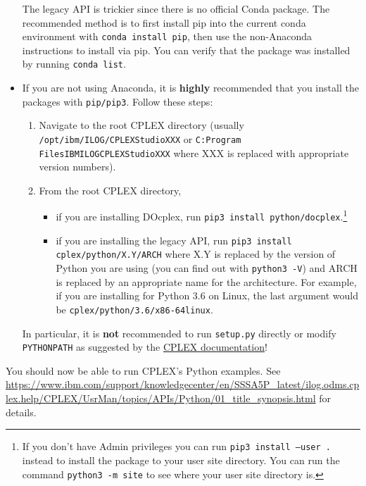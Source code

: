 \documentclass[12pt]{article}
\begin{document}
\begin{itemize}
        The legacy API is trickier since there is no official Conda package.
        The recommended method is to first install pip into the current conda environment with \texttt{conda install pip}, then use the non-Anaconda instructions to install via pip.
        You can verify that the package was installed by running \texttt{conda list}.
    \item If you are not using Anaconda, it is \textbf{highly} recommended that you install the packages with \texttt{pip/pip3}. Follow these steps:
        \begin{enumerate}
            \item Navigate to the root CPLEX directory (usually \texttt{/opt/ibm/ILOG/CPLEX\ttul StudioXXX} or \texttt{C:Program FilesIBMILOGCPLEX\ttul StudioXXX} where XXX is replaced with appropriate version numbers).
            \item From the root CPLEX directory,
                \begin{itemize}
                    \item if you are installing DOcplex, run \texttt{pip3 install python/docplex}.\footnote{
                        If you don't have Admin privileges you can run \texttt{pip3 install --user .} instead to install the package to your user site directory. 
                        You can run the command \texttt{python3 -m site} to see where your user site directory is.
                        }
                    \item if you are installing the legacy API, run \texttt{pip3 install cplex/python/X.Y/ARCH} where X.Y is replaced by the version of Python you are using (you can find out with \texttt{python3 -V}) and ARCH is replaced by an appropriate name for the architecture.
                        For example, if you are installing for Python 3.6 on Linux, the last argument would be \texttt{cplex/python/3.6/x86-64\ttul linux}.
                \end{itemize}
        \end{enumerate}
        In particular, it is \textbf{not} recommended to run \texttt{setup.py} directly or modify \texttt{PYTHONPATH} as suggested by the \href{https://www.ibm.com/support/knowledgecenter/en/SSSA5P_latest/ilog.odms.cplex.help/CPLEX/GettingStarted/topics/set_up/Python_setup.html}{CPLEX documentation}!
\end{itemize}

You should now be able to run CPLEX's Python examples.
See \url{https://www.ibm.com/support/knowledgecenter/en/SSSA5P_latest/ilog.odms.cplex.help/CPLEX/UsrMan/topics/APIs/Python/01_title_synopsis.html} for details.
\end{document}
